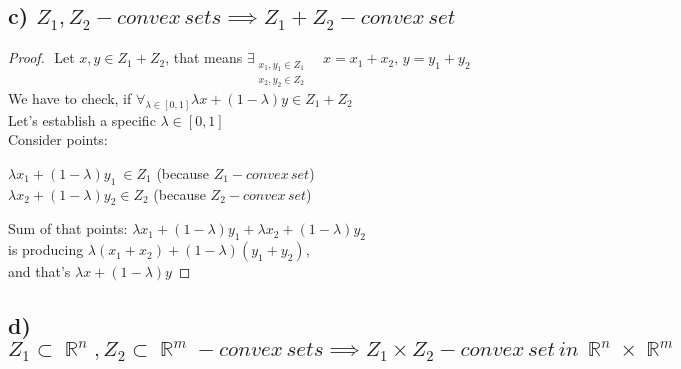 \documentclass[12pt]{article}
\DeclareMathOperator{\R}{\mathbb{R}}
\begin{document}
\subsection*{c) \( Z_1, Z_2 - convex\,sets \implies Z_1+Z_2-convex\,set\)}
\begin{proof}
$ $\newline
Let \(x, y\in Z_1+Z_2\), that means \(\exists_{\substack{x_1, y_1 \in Z_1\\x_2,y_2 \in Z_2}}\quad x=x_1+x_2,\,y=y_1+y_2\) \\
We have to check, if \(\forall_{\lambda \in [0,1]} \lambda x+(1-\lambda)y \in Z_1+Z_2\)\\
Let's establish a specific \(\lambda \in [0,1]\)\\
Consider points: 
\begin{center}
\(\lambda x_1+(1-\lambda) y_1\ \in Z_1\) (because \(Z_1 - convex\,set\))\\ 
\(\lambda x_2+(1-\lambda)y_2 \in Z_2\) (because \(Z_2 - convex\,set\))
\end{center}
Sum of that points: \(\lambda x_1+(1-\lambda) y_1 + \lambda x_2+(1-\lambda)y_2\)\\
is producing \(\lambda (x_1+x_2)+(1-\lambda)(y_1+y_2)\),\\
and that's \(\lambda x+(1-\lambda)y\)
\end{proof}
\newpage
\subsection*{d) \(Z_1 \subset \R^n, Z_2 \subset \R^m - convex\,sets \implies Z_1 \times Z_2 - convex\,set\,in\, \R^n \times \R^m\)}
\end{document}
